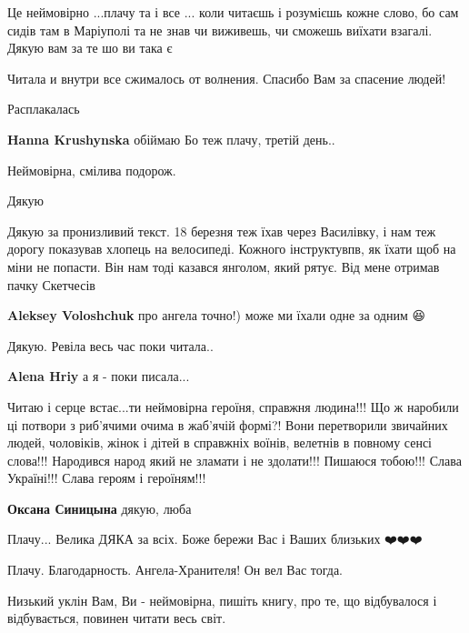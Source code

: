 Це неймовірно ...плачу та і все ... коли читаєшь і розумієшь кожне слово, бо
сам сидів там в Маріуполі та не знав чи виживешь, чи сможешь виїхати взагалі.
Дякую вам за те шо ви така є 🤗


Читала и внутри все сжималось от волнения. Спасибо Вам за спасение людей!🙏


Расплакалась

\begin{itemize} %
\textbf{Hanna Krushynska} обіймаю
Бо теж плачу, третій день..
\end{itemize} %


Неймовірна, смілива подорож.

Дякую


Дякую за пронизливий текст. 18 березня теж їхав через Василівку, і нам теж
дорогу показував хлопець на велосипеді. Кожного інструктувпв, як їхати щоб на
міни не попасти. Він нам тоді казався янголом, який рятує. Від мене отримав
пачку Скетчесів

\begin{itemize} %
\textbf{Aleksey Voloshchuk} про ангела точно!)
може ми їхали одне за одним 😆
\end{itemize} %


Дякую. Ревіла весь час поки читала..

\begin{itemize} %
\textbf{Alena Hriy} а я - поки писала...
\end{itemize} %


Читаю і серце встає...ти неймовірна героїня, справжня людина!!! Що ж наробили
ці потвори з риб'ячими очима в жаб'ячій формі?! Вони перетворили звичайних
людей, чоловіків, жінок і дітей в справжніх воїнів, велетнів в повному сенсі
слова!!! Народився народ який не зламати і не здолати!!! Пишаюся тобою!!! Слава
Україні!!! Слава героям і героїням!!!

\begin{itemize} %
\textbf{Оксана Синицына} дякую, люба 🌼😌
\end{itemize} %


Плачу... Велика ДЯКА за всіх. Боже бережи Вас і Ваших близьких ❤️❤️❤️


Плачу. Благодарность. Ангела-Хранителя! Он вел Вас тогда.


Низький уклін Вам, Ви - неймовірна, пишіть книгу, про те, що відбувалося і
відбувається, повинен читати весь світ.
